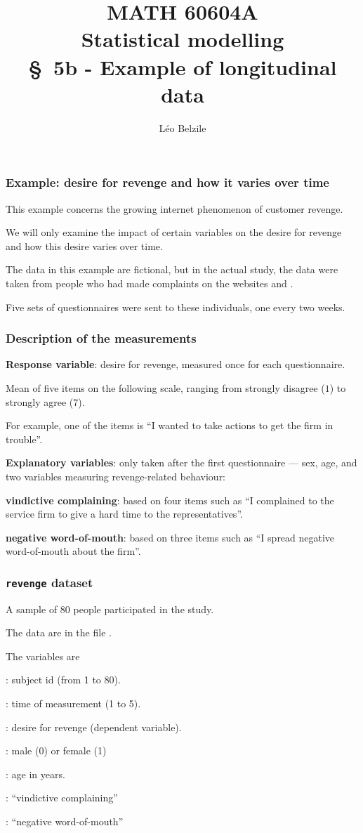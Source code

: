 \documentclass{beamer}
\title[\color{white}{MATH 60604A \S~5b - Example of longitudinal data}]{\texorpdfstring{MATH 60604A \\Statistical modelling \\ \S~5b - Example of longitudinal data}{MATH 60604A \\Statistical modelling \\ \S~5b - Example of longitudinal data}}
\author{Léo Belzile}
\institute{HEC Montréal\\
Department of Decision Sciences}
\date{}
\begin{document}
\frame{\titlepage}

\begin{frame}
\frametitle{Example: desire for revenge and how it varies over time}
\bi
\item This example concerns the growing internet phenomenon of customer revenge. 
\item We will only examine the impact of certain variables on the desire for revenge and how this desire varies over time. 

\item The data in this example are fictional, but in the actual study, the data were taken from people who had made complaints on the websites  and .
\item Five sets of questionnaires were sent to these individuals, one every two weeks.
\ei
\end{frame}

\begin{frame}
\frametitle{Description of the measurements}
\bi
\item \textbf{Response variable}: desire for revenge, measured once for each questionnaire. 
\bi
\item Mean of five items on the following scale, ranging from strongly disagree  ($1$) to strongly agree ($7$).
\bi 
\item For example, one of the items is ``I wanted to take actions to get the firm in trouble''.
\ei
\ei
\item \textbf{Explanatory variables}: only taken after the first questionnaire --- sex, age, and two variables measuring revenge-related behaviour:
\bi
\item \textbf{vindictive complaining}: based on four items such as ``I complained to the service firm to give a hard time to the representatives''.
\item \textbf{negative word-of-mouth}: based on three items such as ``I spread negative word-of-mouth about the firm''.
\ei
\ei
\end{frame}

\begin{frame}
\frametitle{\texttt{revenge} dataset}
\bi
\item A sample of 80 people participated in the study. 
\item The data are in the file . 
\item The variables are
\bi

\item {}: subject id (from 1 to 80).
\item {}: time of measurement (1 to 5).
\item {}: desire for revenge (dependent variable).
\item {}: male (0) or female (1)
\item {}: age in years.
\item {}: ``vindictive complaining''
\item {}: ``negative word-of-mouth''
\ei
\ei
\end{frame}
\end{document}
